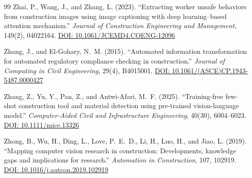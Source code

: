 \documentclass[10pt,letterpaper]{article}
\begin{document}
\begin{thebibliography}{99}
 Zhai, P., Wang, J., and Zhang, L. (2023). ``Extracting worker unsafe behaviors from construction images using image captioning with deep learning--based attention mechanism.'' \textit{Journal of Construction Engineering and Management}, 149(2), 04022164. \href{https://doi.org/10.1061/JCEMD4.COENG-12096}{DOI: 10.1061/JCEMD4.COENG-12096}

 Zhang, J., and El-Gohary, N.~M. (2015). ``Automated information transformation for automated regulatory compliance checking in construction.'' \textit{Journal of Computing in Civil Engineering}, 29(4), B4015001. \href{https://doi.org/10.1061/(ASCE)CP.1943-5487.0000427}{DOI: 10.1061/(ASCE)CP.1943-5487.0000427}

 Zhang, Z., Yu, Y., Pan, Z., and Antwi-Afari, M.~F. (2025). ``Training-free few-shot construction tool and material detection using pre-trained vision-language model.'' \textit{Computer-Aided Civil and Infrastructure Engineering}, 40(30), 6004--6023. \href{https://doi.org/10.1111/mice.13326}{DOI: 10.1111/mice.13326}

 Zhong, B., Wu, H., Ding, L., Love, P.~E.~D., Li, H., Luo, H., and Jiao, L. (2019). ``Mapping computer vision research in construction: Developments, knowledge gaps and implications for research.'' \textit{Automation in Construction}, 107, 102919. \href{https://doi.org/10.1016/j.autcon.2019.102919}{DOI: 10.1016/j.autcon.2019.102919}

\end{thebibliography}
\end{document}
